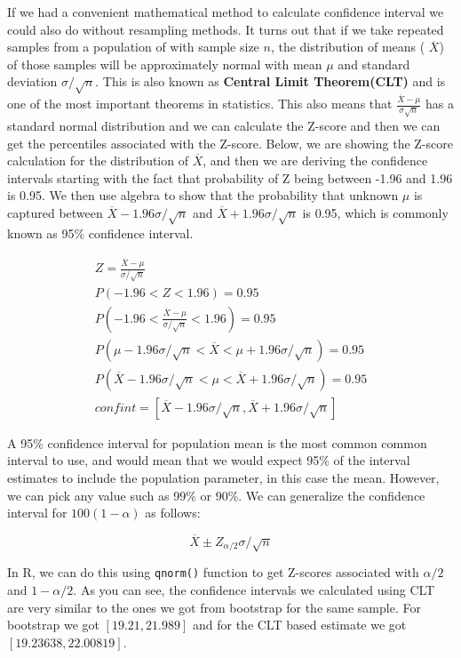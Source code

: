 \documentclass[12pt,]{krantz}
\theoremstyle{definition}
\theoremstyle{definition}
\theoremstyle{definition}
\theoremstyle{remark}
\begin{document}
If we had a convenient mathematical method to calculate confidence
interval we could also do without resampling methods. It turns out that
if we take repeated samples from a population of with sample size \(n\),
the distribution of means ( \(\overline{X}\)) of those samples will be
approximately normal with mean \(\mu\) and standard deviation
\(\sigma/\sqrt{n}\). This is also known as \textbf{Central Limit
Theorem(CLT)} and is one of the most important theorems in statistics.
This also means that \(\frac{\overline{X}-\mu}{\sigma\sqrt{n}}\) has a
standard normal distribution and we can calculate the Z-score and then
we can get the percentiles associated with the Z-score. Below, we are
showing the Z-score calculation for the distribution of
\(\overline{X}\), and then we are deriving the confidence intervals
starting with the fact that probability of Z being between -1.96 and
1.96 is 0.95. We then use algebra to show that the probability that
unknown \(\mu\) is captured between \(\overline{X}-1.96\sigma/\sqrt{n}\)
and \(\overline{X}+1.96\sigma/\sqrt{n}\) is 0.95, which is commonly
known as 95\% confidence interval.

\[\begin{array}{ccc}
Z=\frac{\overline{X}-\mu}{\sigma/\sqrt{n}}\\
P(-1.96 < Z < 1.96)=0.95 \\
P(-1.96 < \frac{\overline{X}-\mu}{\sigma/\sqrt{n}} < 1.96)=0.95\\
P(\mu-1.96\sigma/\sqrt{n} < \overline{X} < \mu+1.96\sigma/\sqrt{n})=0.95\\
P(\overline{X}-1.96\sigma/\sqrt{n} < \mu < \overline{X}+1.96\sigma/\sqrt{n})=0.95\\
confint=[\overline{X}-1.96\sigma/\sqrt{n},\overline{X}+1.96\sigma/\sqrt{n}]
\end{array}\]

A 95\% confidence interval for population mean is the most common common
interval to use, and would mean that we would expect 95\% of the
interval estimates to include the population parameter, in this case the
mean. However, we can pick any value such as 99\% or 90\%. We can
generalize the confidence interval for \(100(1-\alpha)\) as follows:

\[\overline{X} \pm Z_{\alpha/2}\sigma/\sqrt{n}\]

In R, we can do this using \texttt{qnorm()} function to get Z-scores
associated with \({\alpha/2}\) and \({1-\alpha/2}\). As you can see, the
confidence intervals we calculated using CLT are very similar to the
ones we got from bootstrap for the same sample. For bootstrap we got
\([19.21, 21.989]\) and for the CLT based estimate we got
\([19.23638, 22.00819]\).
\end{document}
